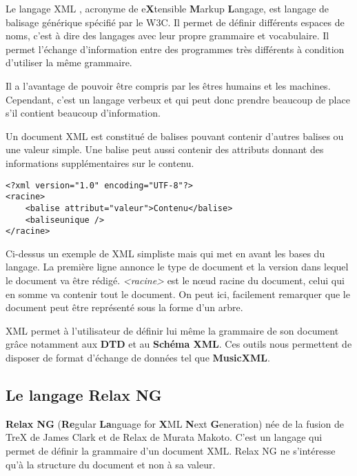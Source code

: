 Le langage XML \cite{xml_w3c, xml_ocr}, acronyme de e\textbf{X}tensible \textbf{M}arkup \textbf{L}angage, est langage de balisage générique spécifié par le W3C. Il permet de définir différents espaces de noms, c'est à dire des langages avec leur propre grammaire et vocabulaire. Il permet l'échange d'information entre des programmes très différents à condition d'utiliser la même grammaire.

\par
Il a l'avantage de pouvoir être compris par les êtres humains et les machines. Cependant, c'est un langage verbeux et qui peut donc prendre beaucoup de place s'il contient beaucoup d'information.

\par
Un document XML est constitué de balises pouvant contenir d'autres balises ou une valeur simple. Une balise peut aussi contenir des attributs donnant des informations supplémentaires sur le contenu.

\begin{lstlisting}[caption=Exemple d'un document XML]
<?xml version="1.0" encoding="UTF-8"?>
<racine>
    <balise attribut="valeur">Contenu</balise>
    <baliseunique />
</racine>
\end{lstlisting}

\par
Ci-dessus un exemple de XML simpliste mais qui met en avant les bases du langage. La première ligne annonce le type de document et la version dans lequel le document va être rédigé. \emph{<racine>} est le nœud racine du document, celui qui en somme va contenir tout le document. On peut ici, facilement remarquer que le document peut être représenté sous la forme d'un arbre.

\par
XML permet à l'utilisateur de définir lui même la grammaire de son document grâce notamment aux \textbf{DTD} et au \textbf{Schéma XML}. Ces outils nous permettent de disposer de format d’échange de données tel que \textbf{MusicXML}.


\subsection{Le langage Relax NG}

\textbf{Relax NG} (\textbf{Re}gular \textbf{La}nguage for \textbf{X}ML \textbf{N}ext \textbf{G}eneration) \cite{relaxng} née de la fusion de TreX de James Clark et de Relax de Murata Makoto. C'est un langage qui permet de définir la grammaire d'un document XML. Relax NG ne s'intéresse qu'à la structure du document et non à sa valeur.

